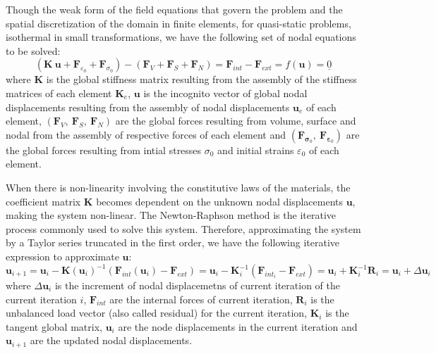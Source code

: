 \documentclass[Journal,letterpaper]{ascelike-new}
\newcommand{\Kll}{\boldsymbol K}
\newcommand{\Fl}{\boldsymbol{F}}
\newcommand{\Rl}{\boldsymbol{R}}
\newcommand{\ul}{\boldsymbol u}
\newcommand{\strain}{\boldsymbol{\varepsilon}}
\newcommand{\stress}{\boldsymbol{\sigma}}
\begin{document}
Though the weak form of the field equations that govern the problem and the spatial discretization of the domain in finite elements, for quasi-static problems, isothermal in small transformations, we have the following set of nodal equations to be solved:
\begin{equation} 	\label{eq:sistema_global}
	\left(\Kll~\ul + \Fl_{\varepsilon_{0}} + \Fl_{\sigma_{0}}\right) - \left(\Fl_V+\Fl_S+\Fl_N \right) = \Fl_{int} - \Fl_{ext} = f(\ul) = \underline{0}  
\end{equation}
where $\Kll$ is the global stiffness matrix resulting from the assembly of the stiffness matrices of each element $\Kll_e$, $\ul$ is the incognito vector of global nodal displacements resulting from the assembly of nodal displacements $\ul_e$ of each element, $(\Fl_V,~\Fl_S,~\Fl_N)$ are the global forces resulting from volume, surface and nodal from the assembly of respective forces of each element and $(\Fl_{\stress_{0}},~\Fl_{\strain_{0}})$ are the global forces resulting from intial stresses $\sigma_0$ and initial strains $\varepsilon_0$ of each element.

When there is non-linearity involving the constitutive laws of the materials, the coefficient matrix $\Kll$ becomes dependent on the unknown nodal displacements $\ul$, making the system non-linear. The Newton-Raphson method is the iterative process commonly used to solve this system. Therefore, approximating the system by a Taylor series truncated in the first order, we have the following iterative expression to approximate $\ul$:
\begin{equation}
	\label{eq:NR}
	\ul_{i+1} = \ul_i - \Kll(\ul_i)^{-1}\left(\Fl_{int}(\ul_i)-\Fl_{ext} \right) = \ul_i - \Kll_i^{-1} \left(\Fl_{int_i} - \Fl_{ext} \right) = \ul_i + \Kll_i^{-1}\Rl_i = \ul_i + \Delta \ul_i
\end{equation}
where $\Delta \ul_i$ is the increment of nodal displacemetns of current iteration of the current iteration $i$, $\Fl_{int}$  are the internal forces of current iteration, $\Rl_i$ is the unbalanced load vector (also called residual) for the current iteration, $\Kll_i$ is the tangent global matrix, $\ul_i$ are the node displacements in the current iteration and $\ul_{i+1}$ are the updated nodal displacements.
\end{document}
